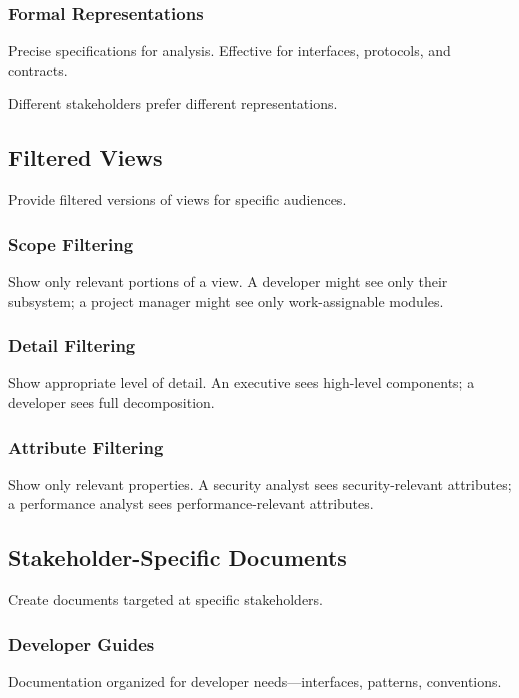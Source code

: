 \documentclass[11pt]{article}
\begin{document}
\subsubsection{Formal Representations}

Precise specifications for analysis. Effective for interfaces, protocols, and contracts.

Different stakeholders prefer different representations.

\subsection{Filtered Views}

Provide filtered versions of views for specific audiences.

\subsubsection{Scope Filtering}

Show only relevant portions of a view. A developer might see only their subsystem; a project manager might see only work-assignable modules.

\subsubsection{Detail Filtering}

Show appropriate level of detail. An executive sees high-level components; a developer sees full decomposition.

\subsubsection{Attribute Filtering}

Show only relevant properties. A security analyst sees security-relevant attributes; a performance analyst sees performance-relevant attributes.

\subsection{Stakeholder-Specific Documents}

Create documents targeted at specific stakeholders.

\subsubsection{Developer Guides}

Documentation organized for developer needs---interfaces, patterns, conventions.
\end{document}
